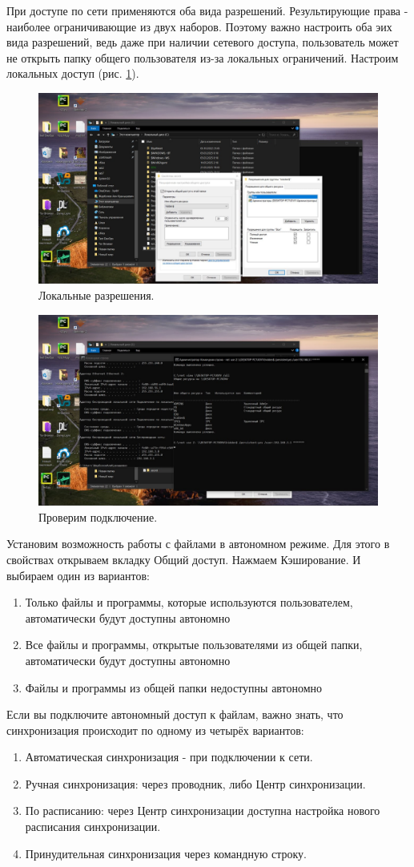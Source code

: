 При доступе по сети применяются оба вида разрешений. Результирующие права - наиболее ограничивающие из двух наборов. Поэтому важно настроить оба эих вида разрешений, ведь даже при наличии сетевого доступа, пользователь может не открыть папку общего пользователя из-за локальных ограничений. Настроим локальных доступ (рис. \ref{fig:localacces}).

\begin{figure}[h!]
    \centering
    \includegraphics[width=0.5\linewidth]{Pic/lab2/photo_2025-05-22_00-26-03.jpg}
    \caption{Локальные разрешения.}
    \label{fig:localacces}
\end{figure}

\begin{figure}[h!]
    \centering
    \includegraphics[width=0.5\linewidth]{Pic/lab2/photo_2025-05-22_00-26-05.jpg}
    \caption{Проверим подключение.}
    \label{fig:checkcon}
\end{figure}
\newpage
Установим возможность работы с файлами в автономном режиме. Для этого в свойствах открываем вкладку Общий доступ. Нажмаем Кэширование. И выбираем один из вариантов:
\begin{enumerate}
    \item Только файлы и программы, которые используются пользователем, автоматически будут доступны автономно
    \item Все файлы и программы, открытые пользователями из общей папки, автоматически будут доступны автономно
    \item Файлы и программы из общей папки недоступны автономно
\end{enumerate}

Если вы подключите автономный доступ к файлам, важно знать, что синхронизация происходит по одному из четырёх вариантов:
\begin{enumerate}
    \item Автоматическая синхронизация - при подключении к сети.
    \item Ручная синхронизация: через проводник, либо Центр синхронизации.
    \item По расписанию: через Центр синхронизации доступна настройка нового расписания синхронизации.
    \item Принудительная синхронизация через командную строку.
\end{enumerate}

